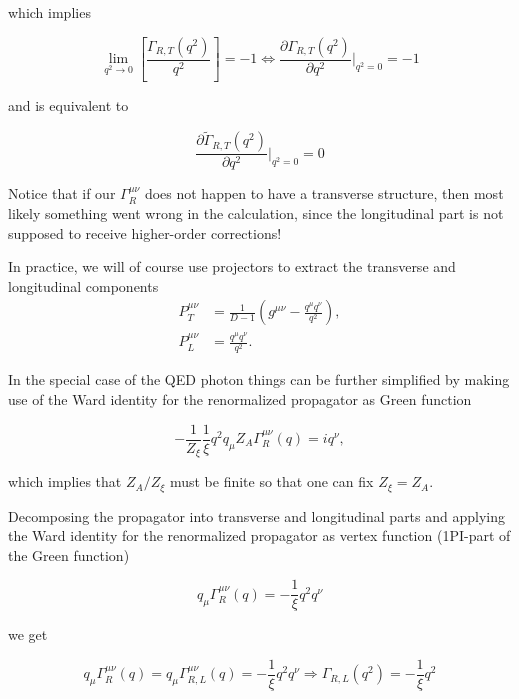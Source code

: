 \documentclass[../FeynCalcManual.tex]{subfiles}
\begin{document}
which implies

\begin{equation}
        \lim_{q^2 \to 0} \left [ \frac{\Gamma_{R,T} (q^2)}{q^2}   \right ] = - 1 \Leftrightarrow \frac{\partial \Gamma_{R,T} (q^2) }{\partial q^2} \biggl |_{q^2=0} = - 1
\end{equation}

and is equivalent to

\begin{equation}
        \frac{\partial \tilde{\Gamma}_{R,T} (q^2) }{\partial q^2} \biggl |_{q^2=0} = 0
\end{equation}

Notice that if our \(\Gamma_R^{\mu \nu}\) does not happen to have a
transverse structure, then most likely something went wrong in the
calculation, since the longitudinal part is not supposed to receive
higher-order corrections!

In practice, we will of course use projectors to extract the transverse
and longitudinal components \begin{align*}
        P^{\mu \nu}_T &= \frac{1}{D-1}  \left ( g^{\mu \nu} - \frac{q^\mu q^\nu}{q^2} \right ), \\
        P^{\mu \nu}_L &= \frac{q^\mu q^\nu}{q^2}.
\end{align*}

In the special case of the QED photon things can be further simplified
by making use of the Ward identity for the renormalized propagator as
Green function

\begin{equation}
    -\frac{1}{Z_\xi} \frac{1}{\xi} q^2 q_\mu Z_A \Gamma_R^{\mu \nu} (q) = i q^\nu,
\end{equation}

which implies that \(Z_A/Z_{\xi}\) must be finite so that one can fix
\(Z_\xi = Z_A\).

Decomposing the propagator into transverse and longitudinal parts and
applying the Ward identity for the renormalized propagator as vertex
function (1PI-part of the Green function)

\begin{equation}
    q_\mu   \Gamma_R^{\mu \nu} (q) = - \frac{1}{\xi} q^2 q^\nu 
\end{equation}

we get

\begin{equation}
    q_\mu   \Gamma_R^{\mu \nu} (q) = q_\mu \Gamma_{R,L}^{\mu \nu} (q) = - \frac{1}{\xi} q^2 q^\nu \Rightarrow  \Gamma_{R,L} (q^2) = - \frac{1}{\xi} q^2
\end{equation}
\end{document}
